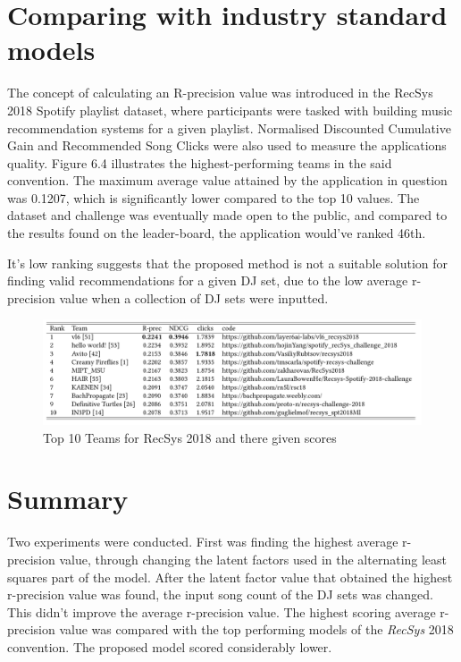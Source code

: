 \section{Comparing with industry standard models}

	The concept of calculating an R-precision value was introduced in the RecSys 2018 Spotify playlist dataset, where participants were tasked with building music recommendation systems for a given playlist. Normalised Discounted Cumulative Gain and Recommended Song Clicks were also used to measure the applications quality. Figure 6.4 illustrates the highest-performing teams in the said convention. The maximum average value attained by the application in question was 0.1207, which is significantly lower compared to the top 10 values. The dataset and challenge was eventually made open to the public, and compared to the results found on the leader-board, the application would've ranked 46th. 

It's low ranking suggests that the proposed method is not a suitable solution for finding valid recommendations for a given DJ set, due to the low average r-precision value when a collection of DJ sets were inputted.
\begin{figure}[H]
	\hspace*{-0.5cm} 
	\includegraphics[scale=0.55]{images/recsys_scores}
	\caption{Top 10 Teams for RecSys 2018 and there given scores \citep{zamani_analysis_2019}} 
\end{figure}

\section{Summary}
Two experiments were conducted. First was finding the highest average r-precision value, through changing the latent factors used in the alternating least squares part of the model. After the latent factor value that obtained the highest r-precision value was found, the input song count of the DJ sets was changed. This didn't improve the average r-precision value. The highest scoring average r-precision value was compared with the top performing models of the \textit{RecSys} 2018 convention. The proposed model scored considerably lower. 

